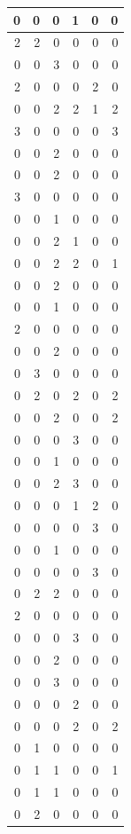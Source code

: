 \documentclass[
  12pt,
]{krantz}
\begin{document}
\begin{tabular}{r|r|r|r|r|r}
\hline
0 & 0 & 0 & 1 & 0 & 0\\
\hline
2 & 2 & 0 & 0 & 0 & 0\\
\hline
0 & 0 & 3 & 0 & 0 & 0\\
\hline
2 & 0 & 0 & 0 & 2 & 0\\
\hline
0 & 0 & 2 & 2 & 1 & 2\\
\hline
3 & 0 & 0 & 0 & 0 & 3\\
\hline
0 & 0 & 2 & 0 & 0 & 0\\
\hline
0 & 0 & 2 & 0 & 0 & 0\\
\hline
3 & 0 & 0 & 0 & 0 & 0\\
\hline
0 & 0 & 1 & 0 & 0 & 0\\
\hline
0 & 0 & 2 & 1 & 0 & 0\\
\hline
0 & 0 & 2 & 2 & 0 & 1\\
\hline
0 & 0 & 2 & 0 & 0 & 0\\
\hline
0 & 0 & 1 & 0 & 0 & 0\\
\hline
2 & 0 & 0 & 0 & 0 & 0\\
\hline
0 & 0 & 2 & 0 & 0 & 0\\
\hline
0 & 3 & 0 & 0 & 0 & 0\\
\hline
0 & 2 & 0 & 2 & 0 & 2\\
\hline
0 & 0 & 2 & 0 & 0 & 2\\
\hline
0 & 0 & 0 & 3 & 0 & 0\\
\hline
0 & 0 & 1 & 0 & 0 & 0\\
\hline
0 & 0 & 2 & 3 & 0 & 0\\
\hline
0 & 0 & 0 & 1 & 2 & 0\\
\hline
0 & 0 & 0 & 0 & 3 & 0\\
\hline
0 & 0 & 1 & 0 & 0 & 0\\
\hline
0 & 0 & 0 & 0 & 3 & 0\\
\hline
0 & 2 & 2 & 0 & 0 & 0\\
\hline
2 & 0 & 0 & 0 & 0 & 0\\
\hline
0 & 0 & 0 & 3 & 0 & 0\\
\hline
0 & 0 & 2 & 0 & 0 & 0\\
\hline
0 & 0 & 3 & 0 & 0 & 0\\
\hline
0 & 0 & 0 & 2 & 0 & 0\\
\hline
0 & 0 & 0 & 2 & 0 & 2\\
\hline
0 & 1 & 0 & 0 & 0 & 0\\
\hline
0 & 1 & 1 & 0 & 0 & 1\\
\hline
0 & 1 & 1 & 0 & 0 & 0\\
\hline
0 & 2 & 0 & 0 & 0 & 0\\

\end{tabular}
\end{document}
